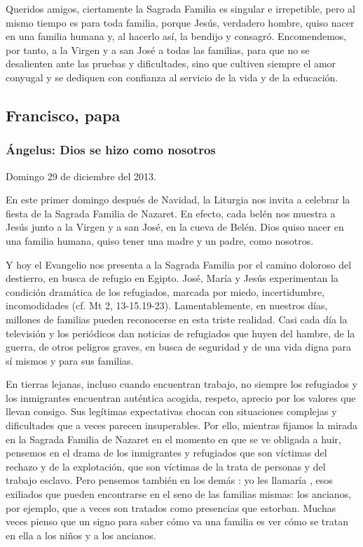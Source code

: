 \begin{body}
\begin{body}
Queridos amigos, ciertamente la Sagrada Familia es singular e irrepetible, pero al mismo tiempo es  para toda familia, porque Jesús, verdadero hombre, quiso nacer en una familia humana y, al hacerlo así, la bendijo y consagró. Encomendemos, por tanto, a la Virgen y a san José a todas las familias, para que no se desalienten ante las pruebas y dificultades, sino que cultiven siempre el amor conyugal y se dediquen con confianza al servicio de la vida y de la educación.

\subsection{Francisco, papa}

\subsubsection{Ángelus: Dios se hizo como nosotros}

Domingo 29 de diciembre del 2013.

En este primer domingo después de Navidad, la Liturgia nos invita a celebrar la fiesta de la Sagrada Familia de Nazaret. En efecto, cada belén nos muestra a Jesús junto a la Virgen y a san José, en la cueva de Belén. Dios quiso nacer en una familia humana, quiso tener una madre y un padre, como nosotros.

Y hoy el Evangelio nos presenta a la Sagrada Familia por el camino doloroso del destierro, en busca de refugio en Egipto. José, María y Jesús experimentan la condición dramática de los refugiados, marcada por miedo, incertidumbre, incomodidades (cf. Mt 2, 13-15.19-23). Lamentablemente, en nuestros días, millones de familias pueden reconocerse en esta triste realidad. Casi cada día la televisión y los periódicos dan noticias de refugiados que huyen del hambre, de la guerra, de otros peligros graves, en busca de seguridad y de una vida digna para sí mismos y para sus familias.

En tierras lejanas, incluso cuando encuentran trabajo, no siempre los refugiados y los inmigrantes encuentran auténtica acogida, respeto, aprecio por los valores que llevan consigo. Sus legítimas expectativas chocan con situaciones complejas y dificultades que a veces parecen insuperables. Por ello, mientras fijamos la mirada en la Sagrada Familia de Nazaret en el momento en que se ve obligada a huir, pensemos en el drama de los inmigrantes y refugiados que son víctimas del rechazo y de la explotación, que son víctimas de la trata de personas y del trabajo esclavo. Pero pensemos también en los demás : yo les llamaría , esos exiliados que pueden encontrarse en el seno de las familias mismas: los ancianos, por ejemplo, que a veces son tratados como presencias que estorban. Muchas veces pienso que un signo para saber cómo va una familia es ver cómo se tratan en ella a los niños y a los ancianos.


\end{body}
\end{body}
